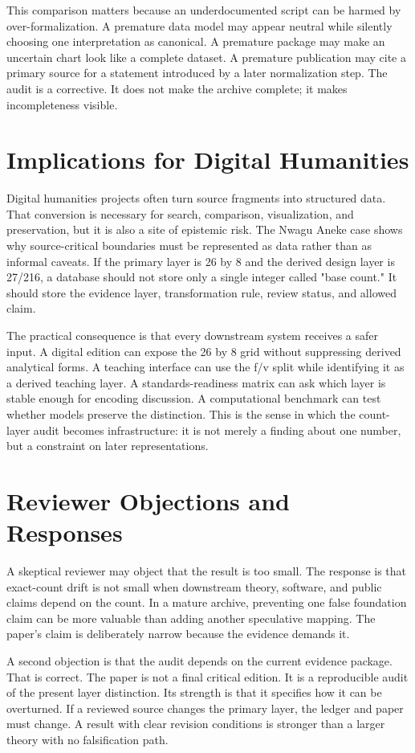 \documentclass[sigconf,nonacm]{acmart}
\begin{document}
This comparison matters because an underdocumented script can be harmed by
over-formalization. A premature data model may appear neutral while silently
choosing one interpretation as canonical. A premature package may make an
uncertain chart look like a complete dataset. A premature publication may cite a
primary source for a statement introduced by a later normalization step. The
audit is a corrective. It does not make the archive complete; it makes
incompleteness visible.

\section{Implications for Digital Humanities}
Digital humanities projects often turn source fragments into structured data.
That conversion is necessary for search, comparison, visualization, and
preservation, but it is also a site of epistemic risk. The Nwagu Aneke case
shows why source-critical boundaries must be represented as data rather than as
informal caveats. If the primary layer is 26 by 8 and the derived design layer
is 27/216, a database should not store only a single integer called "base
count." It should store the evidence layer, transformation rule, review status,
and allowed claim.

The practical consequence is that every downstream system receives a safer
input. A digital edition can expose the 26 by 8 grid without suppressing derived
analytical forms. A teaching interface can use the f/v split while identifying
it as a derived teaching layer. A standards-readiness matrix can ask which layer
is stable enough for encoding discussion. A computational benchmark can test
whether models preserve the distinction. This is the sense in which the
count-layer audit becomes infrastructure: it is not merely a finding about one
number, but a constraint on later representations.

\section{Reviewer Objections and Responses}
A skeptical reviewer may object that the result is too small. The response is
that exact-count drift is not small when downstream theory, software, and public
claims depend on the count. In a mature archive, preventing one false foundation
claim can be more valuable than adding another speculative mapping. The paper's
claim is deliberately narrow because the evidence demands it.

A second objection is that the audit depends on the current evidence package.
That is correct. The paper is not a final critical edition. It is a reproducible
audit of the present layer distinction. Its strength is that it specifies how it
can be overturned. If a reviewed source changes the primary layer, the ledger
and paper must change. A result with clear revision conditions is stronger than
a larger theory with no falsification path.
\end{document}
